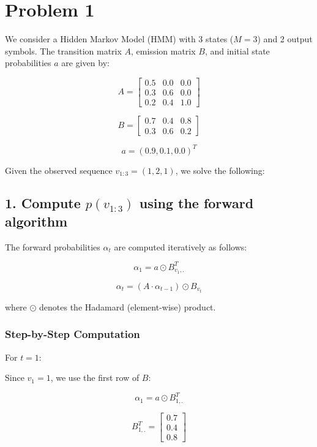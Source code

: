 \documentclass{article}
\begin{document}






\section*{Problem 1}

We consider a Hidden Markov Model (HMM) with 3 states (\( M = 3 \)) and 2 output symbols. The transition matrix \( A \), emission matrix \( B \), and initial state probabilities \( a \) are given by:

\[
A =
\begin{bmatrix}
0.5 & 0.0 & 0.0 \\
0.3 & 0.6 & 0.0 \\
0.2 & 0.4 & 1.0
\end{bmatrix}
\]

\[
B =
\begin{bmatrix}
0.7 & 0.4 & 0.8 \\
0.3 & 0.6 & 0.2
\end{bmatrix}
\]

\[
a = (0.9, 0.1, 0.0)^T
\]

Given the observed sequence \( v_{1:3} = (1,2,1) \), we solve the following:

\subsection*{1. Compute \( p(v_{1:3}) \) using the forward algorithm}

The forward probabilities \( \alpha_t \) are computed iteratively as follows:

\[
\alpha_1 = a \odot B_{v_1,.}^T
\]

\[
\alpha_t = (A \cdot \alpha_{t-1}) \odot B_{v_t}
\]

where \( \odot \) denotes the Hadamard (element-wise) product.

\subsubsection*{Step-by-Step Computation}

For \( t = 1 \):

Since \( v_1 = 1 \), we use the first row of \( B \):

\[
\alpha_1 = a \odot B_{1,.}^T
\]


\[
B_{1,.}^T = 
\begin{bmatrix} 
0.7 \\ 0.4 \\ 0.8
\end{bmatrix}
\]
\end{document}
